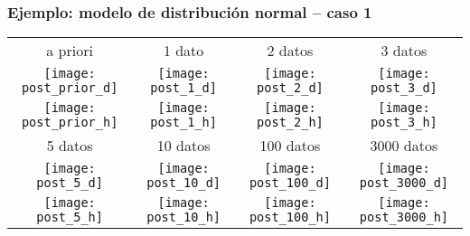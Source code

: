 \documentclass[table]{beamer}
\begin{document}
\begin{frame}
    \frametitle{Ejemplo: modelo de distribución normal -- caso 1}
    \begin{center}
        \begin{tabular}{cccc}
            a priori & 1 dato & 2 datos & 3 datos \\
            \texttt{[image: post\_prior\_d]} &
            \texttt{[image: post\_1\_d]} &
            \texttt{[image: post\_2\_d]} &
            \texttt{[image: post\_3\_d]} \\
            \texttt{[image: post\_prior\_h]} &
            \texttt{[image: post\_1\_h]} &
            \texttt{[image: post\_2\_h]} &
            \texttt{[image: post\_3\_h]} \\
            5 datos & 10 datos & 100 datos & 3000 datos \\
            \texttt{[image: post\_5\_d]} &
            \texttt{[image: post\_10\_d]} &
            \texttt{[image: post\_100\_d]} &
            \texttt{[image: post\_3000\_d]} \\
            \texttt{[image: post\_5\_h]} &
            \texttt{[image: post\_10\_h]} &
            \texttt{[image: post\_100\_h]} &
            \texttt{[image: post\_3000\_h]} \\
        \end{tabular}
    \end{center}
\end{frame}
\end{document}
